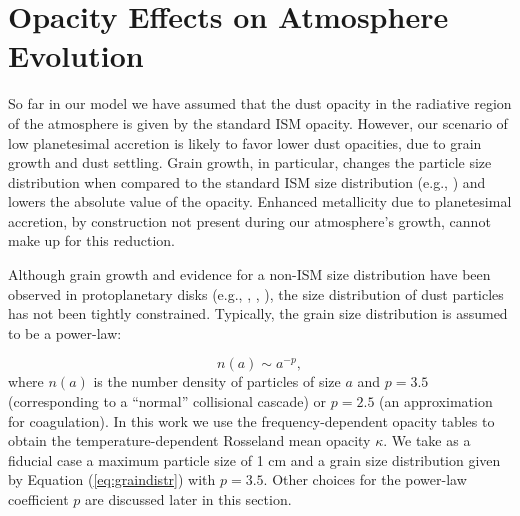 \documentclass[apj]{emulateapj}
\begin{document}
%
%


\section{Opacity Effects on Atmosphere Evolution}
\label{sec:opacity}


So far in our model we have assumed that the dust opacity in the radiative region of the atmosphere is given by the standard ISM opacity. However, our scenario of low planetesimal accretion is likely to favor lower dust opacities, due to grain growth and dust settling. Grain growth, in particular, changes the particle size distribution when compared to the standard ISM size distribution (e.g., \citealt{pollack85}) and lowers the absolute value of the opacity. Enhanced metallicity due to planetesimal accretion, by construction not present during our atmosphere's growth, cannot make up for this reduction.


Although grain growth and evidence for a non-ISM size distribution have been observed in protoplanetary disks (e.g., \citealt{beckwith90}, \citealt{beckwith91}, \citealt{perez12}), the size distribution of dust particles has not been tightly constrained. Typically, the grain size distribution is assumed to be a power-law: 

\begin{equation}
\label{eq:graindistr}
n(a) \sim a^{-p},
\end{equation}
where $n(a)$ is the number density of particles of size $a$ and $p=3.5$ (corresponding to a ``normal'' collisional cascade) or $p=2.5$ (an approximation for coagulation). In this work we use the  \citet{dalessio01} frequency-dependent opacity tables to obtain the temperature-dependent Rosseland mean opacity $\kappa$. We take as a fiducial case a maximum particle size of 1 cm and a grain size distribution given by Equation (\ref{eq:graindistr}) with $p=3.5$. Other choices for the power-law coefficient $p$ are discussed later in this section. 
\end{document}
